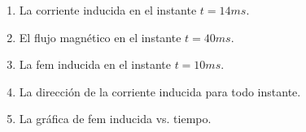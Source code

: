 \documentclass[10pt, twoside]{article}
\begin{document}
\begin{enumerate}
\begin{figure}[H]
		\end{figure}

		\begin{enumerate}
			\item La corriente inducida en el instante $t=14ms$.
			\item El flujo magnético en el instante $t=40ms$.
			\item La fem inducida en el instante $t=10ms$.
			\item La dirección de la corriente inducida para todo instante.
			\item La gráfica de fem inducida vs. tiempo.
		\end{enumerate}
\end{enumerate}
\end{document}
